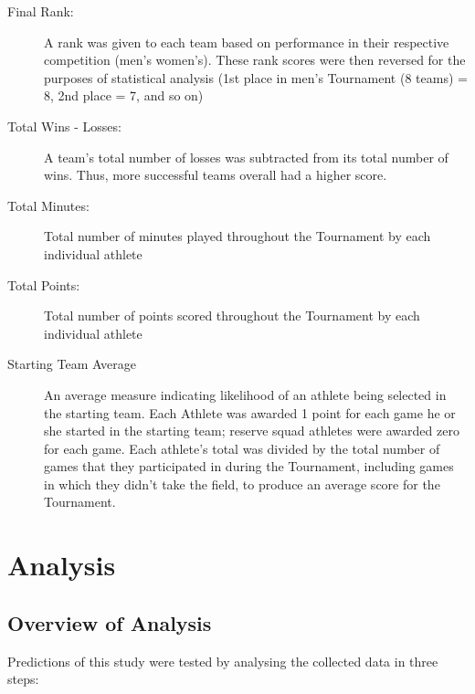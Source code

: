\begin{description}
\item [Final Rank:] A rank was given to each team based on performance in their respective competition (men's   women's). These rank scores were then reversed for the purposes of statistical analysis (1st place in men's Tournament (8 teams) = 8, 2nd place = 7, and so on)
\item [Total Wins - Losses:] A team's total number of losses was subtracted from its total number of wins.  Thus, more successful teams overall had a higher score.
\item [Total Minutes:] Total number of minutes played throughout the Tournament by each individual athlete
\item [Total Points:] Total number of points scored throughout the Tournament by each individual athlete
\item [Starting Team Average] An average measure indicating likelihood of an athlete being selected in the starting team. Each Athlete was awarded 1 point for each game he or she started in the starting team; reserve squad athletes were awarded zero for each game. Each athlete's total was divided by the total number of games that they participated in during the Tournament, including games in which they didn't take the field, to produce an average score for the Tournament.
\end{description}



























\clearpage
\section{Analysis}


\subsection{Overview of Analysis}

Predictions of this study were tested by analysing the collected data in three steps:

